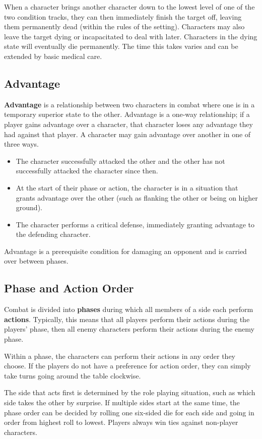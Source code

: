 \documentclass[11pt]{article}
\begin{document}
When a character brings another character down to the lowest level of one of the two condition tracks, they can then immediately finish the target off, leaving them permanently dead (within the rules of the setting).  Characters may also leave the target dying or incapacitated to deal with later.  Characters in the dying state will eventually die permanently. The time this takes varies and can be extended by basic medical care.

\subsection{Advantage}
\textbf{Advantage} is a relationship between two characters in combat where one is in a temporary superior state to the other.
Advantage is a one-way relationship; if a player gains advantage over a character, that character loses any advantage they had against that player.
A character may gain advantage over another in one of three ways.

\begin{itemize}
	\item The character successfully attacked the other and the other has not successfully attacked the character since then.
	\item At the start of their phase or action, the character is in a situation that grants advantage over the other (such as flanking the other or being on higher ground).
	\item The character performs a critical defense, immediately granting advantage to the defending character.
\end{itemize}

Advantage is a prerequisite condition for damaging an opponent and is carried over between phases.

\subsection{Phase and Action Order}
Combat is divided into \textbf{phases} during which all members of a side each perform \textbf{actions}.
Typically, this means that all players perform their actions during the players' phase, then all enemy characters perform their actions during the enemy phase.

Within a phase, the characters can perform their actions in any order they choose.
If the players do not have a preference for action order, they can simply take turns going around the table clockwise.

The side that acts first is determined by the role playing situation, such as which side takes the other by surprise.
If multiple sides start at the same time, the phase order can be decided by rolling one six-sided die for each side and going in order from highest roll to lowest.
Players always win ties against non-player characters.
\end{document}
